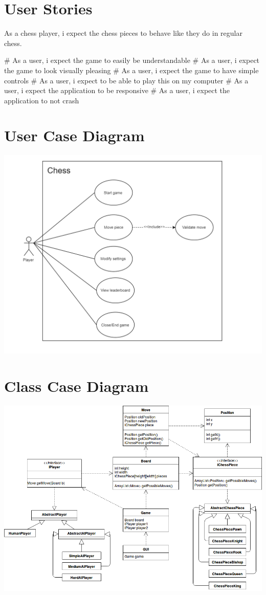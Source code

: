 \documentclass{article}
\begin{document}
\section*{User Stories}
As a chess player, i expect the chess pieces to behave like they do in regular chess.

\begin{easylist}[itemize]
# As a user, i expect the game to easily be understandable
# As a user, i expect the game to look visually pleasing
# As a user, i expect the game to have simple controls
# As a user, i expect to be able to play this on my computer
# As a user, i expect the application to be responsive
# As a user, i expect the application to not crash
\end{easylist}

\section*{User Case Diagram}
\includegraphics[width=15cm]{usecasediagram}

\section*{Class Case Diagram}
\includegraphics[width=15cm]{classdiagram}
\end{document}
